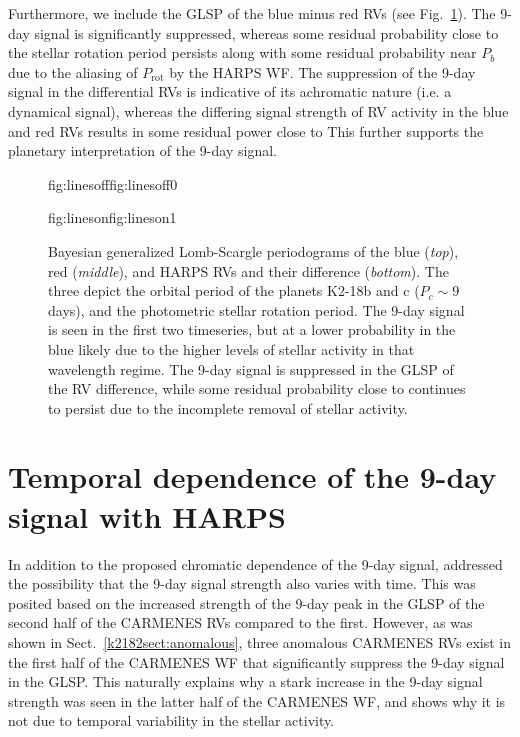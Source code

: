 Furthermore, we include the GLSP of the blue minus red RVs (see Fig.~\ref{k2182fig:glspchrom}). The 
9-day signal is significantly suppressed, whereas some residual probability close to the stellar rotation period persists
along with some residual probability near $P_b$ due to the aliasing of $P_{\text{rot}}$ by the HARPS WF.
The suppression of the 9-day signal in the differential RVs is indicative of its achromatic nature
(i.e. a dynamical signal), whereas the differing signal strength of RV activity in the blue and red RVs results in some
residual power close to  This further supports the planetary interpretation of the 9-day signal. 

\begin{figure}
  \centering
  \hspace{-0.6\hsize}%
  \begin{ocg}{fig:linesoff}{fig:linesoff}{0}%
  \end{ocg}%
  \begin{ocg}{fig:lineson}{fig:lineson}{1}%
  \end{ocg}
  \hspace{-0.6\hsize}%
  \caption[Bayesian Lomb-Scargle periodograms of the chromatic HARPS RVs.]
    {\small Bayesian generalized Lomb-Scargle periodograms of the blue (\emph{top}), red (\emph{middle}), and 
    HARPS RVs and their difference (\emph{bottom}). The three
     depict the orbital
    period of the planets K2-18b and c ($P_c\sim 9$ days), and the photometric stellar rotation period.
    The 9-day signal is seen in the first two timeseries, but at a lower probability in the blue likely due to the
    higher levels of stellar activity in that wavelength regime.
    The 9-day signal is suppressed in the GLSP of the RV difference, while some residual probability close to \prot{}
    continues to persist due to the incomplete removal of stellar activity.}
  \label{k2182fig:glspchrom}
\end{figure}


\section{Temporal dependence of the 9-day signal with HARPS} \label{k2182sect:temporal}
In addition to the proposed chromatic dependence of the 9-day signal,  addressed
the possibility that the 9-day signal strength also varies with time. This was posited based on the increased 
strength of the 9-day peak in the GLSP of the second half of the CARMENES RVs compared to the first. However, as was
shown in Sect.~\ref{k2182sect:anomalous}, three anomalous CARMENES RVs exist in the first half of the CARMENES WF
that significantly suppress the 9-day signal in the GLSP. This naturally explains why a stark increase in the 9-day
signal strength was seen in the latter half of the CARMENES WF, and shows why it is not due to temporal variability in the
stellar activity.

